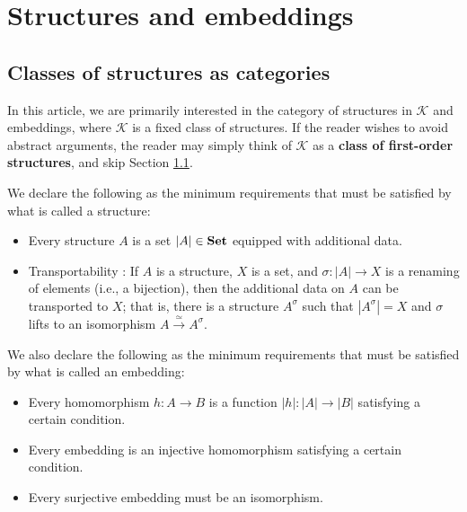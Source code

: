 \documentclass[10pt]{amsart}
\numberwithin{equation}{section}
\theoremstyle{plain}
\theoremstyle{definition}
\newtheorem{example}[theorem]{Example}
\newcommand{\K}{\mathcal{K}}
\newcommand{\edge}[1]{\overset{#1}{\longrightarrow}}
\newcommand{\com}[1]{
\color{magenta}\emph{#1}
\color{black}}
\begin{document}
%
%
%
%

\section{Structures and embeddings}

\subsection{Classes of structures as categories}\label{sec:class-str-cat}

In this article, we are primarily interested in the category of structures in $\K$ and embeddings, where $\mathcal{K}$ is a fixed class of structures.
If the reader wishes to avoid abstract arguments, the reader may simply think of $\K$ as a {\bf class of first-order structures}, and skip Section \ref{sec:class-str-cat}.

We declare the following as the minimum requirements that must be satisfied by what is called a structure:
\begin{itemize}
\item Every structure $A$ is a set $|A|\in{\bf Set}$ equipped with additional data.
\item Transportability \cite[Definition 5.28]{Joy}: If $A$ is a structure, $X$ is a set, and $\sigma\colon |A|\to X$ is a renaming of elements (i.e., a bijection), then the additional data on $A$ can be transported to $X$; that is, there is a structure $A^\sigma$ such that $|A^\sigma|=X$ and $\sigma$ lifts to an isomorphism $A\edge{\simeq} A^\sigma$.
\end{itemize}

We also declare the following as the minimum requirements that must be satisfied by what is called an embedding:
\begin{itemize}
\item Every homomorphism $h\colon A\to B$ is a function $|h|\colon |A|\to |B|$ satisfying a certain condition.
\item Every embedding is an injective homomorphism satisfying a certain condition.
\item Every surjective embedding must be an isomorphism.
\end{itemize}
\end{document}

